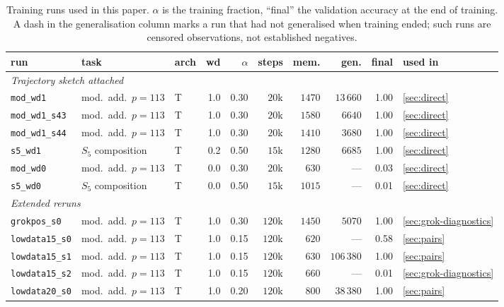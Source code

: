 \documentclass{article}
\begin{document}
\begin{table}[H]
\centering
\caption{Training runs used in this paper. $\alpha$ is the training fraction, ``final'' the
validation accuracy at the end of training. A dash in the generalisation column marks a run that
had not generalised when training ended; such runs are censored observations, not established
negatives.}
\label{tab:runs}
\setlength{\tabcolsep}{4pt}
\small
\begin{tabular}{lllrrrrrrl}
\toprule
run & task & arch & wd & $\alpha$ & steps & mem. & gen. & final & used in \\
\midrule
\multicolumn{10}{l}{\emph{Trajectory sketch attached}} \\
\texttt{mod\_wd1}     & mod.\ add.\ $p{=}113$ & T & 1.0 & 0.30 & $20$k  & $1470$ & $13\,660$ & 1.00 & \cref{sec:direct} \\
\texttt{mod\_wd1\_s43} & mod.\ add.\ $p{=}113$ & T & 1.0 & 0.30 & $20$k  & $1580$ & $6640$  & 1.00 & \cref{sec:direct} \\
\texttt{mod\_wd1\_s44} & mod.\ add.\ $p{=}113$ & T & 1.0 & 0.30 & $20$k  & $1410$ & $3680$  & 1.00 & \cref{sec:direct} \\
\texttt{s5\_wd1}      & $S_5$ composition     & T & 0.2 & 0.50 & $15$k  & $1280$ & $6685$  & 1.00 & \cref{sec:direct} \\
\texttt{mod\_wd0}     & mod.\ add.\ $p{=}113$ & T & 0.0 & 0.30 & $20$k  & $630$    & ---       & 0.03 & \cref{sec:direct} \\
\texttt{s5\_wd0}      & $S_5$ composition     & T & 0.0 & 0.50 & $15$k  & $1015$ & ---       & 0.01 & \cref{sec:direct} \\
\midrule
\multicolumn{10}{l}{\emph{Extended reruns}} \\
\texttt{grokpos\_s0}   & mod.\ add.\ $p{=}113$ & T & 1.0 & 0.30 & $120$k & $1450$ & $5070$   & 1.00 & \cref{sec:grok-diagnostics} \\
\texttt{lowdata15\_s0} & mod.\ add.\ $p{=}113$ & T & 1.0 & 0.15 & $120$k & $620$    & ---        & 0.58 & \cref{sec:pairs} \\
\texttt{lowdata15\_s1} & mod.\ add.\ $p{=}113$ & T & 1.0 & 0.15 & $120$k & $630$    & $106\,380$ & 1.00 & \cref{sec:pairs} \\
\texttt{lowdata15\_s2} & mod.\ add.\ $p{=}113$ & T & 1.0 & 0.15 & $120$k & $660$    & ---        & 0.01 & \cref{sec:grok-diagnostics} \\
\texttt{lowdata20\_s0} & mod.\ add.\ $p{=}113$ & T & 1.0 & 0.20 & $120$k & $800$    & $38\,380$  & 1.00 & \cref{sec:pairs} \\

\end{tabular}
\end{table}
\end{document}
